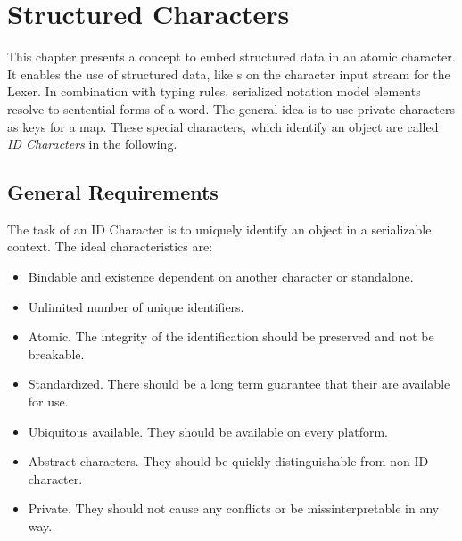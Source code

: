 \section{Structured Characters}
This chapter presents a concept to embed structured data in an atomic character. It enables the use of structured data, like s on the character input stream for the Lexer. In combination with typing rules, serialized notation model elements resolve to sentential forms of a word. The general idea is to use private characters as keys for a map. These special characters, which identify an object are called \emph{ID Characters} in the following.

\subsection{General Requirements}
The task of an ID Character is to uniquely identify an object in a serializable context. 
The ideal characteristics are:
\begin{itemize}
	\item Bindable and existence dependent on another character or standalone.
	\item Unlimited number of unique identifiers.
	\item Atomic. The integrity of the identification should be preserved and not be breakable.
	\item Standardized. There should be a long term guarantee that their are available for use.
	\item Ubiquitous available. They should be available on every platform.
	\item Abstract characters. They should be quickly distinguishable from non ID character.
	\item Private. They should not cause any conflicts or be missinterpretable in any way.
\end{itemize}

